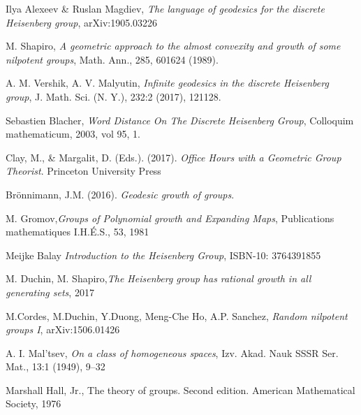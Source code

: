 \documentclass[11pt]{amsart}
\theoremstyle{plain}
\theoremstyle{definition}
\numberwithin{equation}{section}
\begin{document}
\begin{thebibliography}{99}
 Ilya Alexeev \& Ruslan Magdiev, {\it The language of geodesics for the discrete Heisenberg group}, arXiv:1905.03226

 M. Shapiro, {\it A geometric approach to the almost convexity and growth of some nilpotent groups}, Math. Ann., 285, 601624 (1989).
 
  A. M. Vershik, A. V. Malyutin, {\it Infinite geodesics in the discrete Heisenberg group}, J. Math. Sci. (N. Y.), 232:2 (2017), 121128.
 
   Sebastien Blacher, {\it Word Distance On The Discrete Heisenberg Group}, Colloquim mathematicum, 2003, vol 95, 1.
 
 Clay, M., \& Margalit, D. (Eds.). (2017). {\it Office Hours with a Geometric Group Theorist}. Princeton University Press

Brönnimann, J.M. (2016). {\it Geodesic growth of groups}.

 M. Gromov,{\it Groups of Polynomial growth and Expanding Maps}, Publications mathematiques I.H.É.S., 53, 1981


 Meijke Balay {\it Introduction to the Heisenberg Group}, ISBN-10: 3764391855

 M. Duchin, M. Shapiro,{\it The Heisenberg group has rational growth in all generating sets}, 2017

 M.Cordes, M.Duchin, Y.Duong, Meng-Che Ho, A.P. Sanchez, {\it Random nilpotent groups I}, arXiv:1506.01426


 A. I. Mal'tsev, {\it On a class of homogeneous spaces}, Izv. Akad. Nauk SSSR Ser. Mat., 13:1 (1949), 9–32
    
 Marshall Hall, Jr., The theory of groups. Second edition. American Mathematical Society, 1976

\end{thebibliography}
\end{document}
